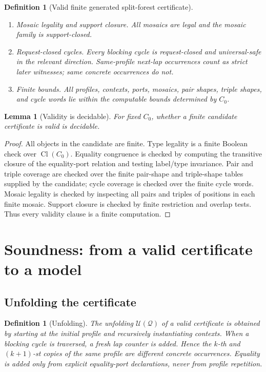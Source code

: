 \documentclass[11pt]{article}
\newtheorem{lemma}[theorem]{Lemma}
\newtheorem{definition}[theorem]{Definition}
\newcommand{\Cl}{\operatorname{Cl}}
\newcommand{\Q}{\mathcal Q}
\newcommand{\U}{\mathcal U}
\begin{document}
\begin{definition}[Valid finite generated split-forest certificate]
\begin{enumerate}[label=(V\arabic*)]
\item \emph{Mosaic legality and support closure.}  All mosaics are legal and the mosaic family is support-closed.
\item \emph{Request-closed cycles.}  Every blocking cycle is request-closed and universal-safe in the relevant direction.  Same-profile next-lap occurrences count as strict later witnesses; same concrete occurrences do not.
\item \emph{Finite bounds.}  All profiles, contexts, ports, mosaics, pair shapes, triple shapes, and cycle words lie within the computable bounds determined by $C_0$.
\end{enumerate}
\end{definition}

\begin{lemma}[Validity is decidable]\label{lem:validity-decidable}
For fixed $C_0$, whether a finite candidate certificate is valid is decidable.
\end{lemma}

\begin{proof}
All objects in the candidate are finite.  Type legality is a finite Boolean check over $\Cl(C_0)$.  Equality congruence is checked by computing the transitive closure of the equality-port relation and testing label/type invariance.  Pair and triple coverage are checked over the finite pair-shape and triple-shape tables supplied by the candidate; cycle coverage is checked over the finite cycle words.  Mosaic legality is checked by inspecting all pairs and triples of positions in each finite mosaic.  Support closure is checked by finite restriction and overlap tests.  Thus every validity clause is a finite computation.
\end{proof}

\section{Soundness: from a valid certificate to a model}

\subsection{Unfolding the certificate}

\begin{definition}[Unfolding]\label{def:unfolding}
The unfolding $\U(\Q)$ of a valid certificate is obtained by starting at the initial profile and recursively instantiating contexts.  When a blocking cycle is traversed, a fresh lap counter is added.  Hence the $k$-th and $(k+1)$-st copies of the same profile are different concrete occurrences.  Equality is added only from explicit equality-port declarations, never from profile repetition.
\end{definition}
\end{document}

